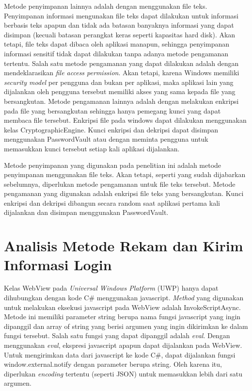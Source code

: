 Metode penyimpanan lainnya adalah dengan menggunakan file teks. Penyimpanan informasi mengunakan file teks dapat dilakukan untuk informasi berbasis teks apapun dan tidak ada batasan banyaknya informasi yang dapat disimpan (kecuali batasan perangkat keras seperti kapasitas hard disk). Akan tetapi, file teks dapat dibaca oleh aplikasi manapun, sehingga penyimpanan informasi sensitif tidak dapat dilakukan tanpa adanya metode pengamanan tertentu. Salah satu metode pengamanan yang dapat dilakukan adalah dengan mendeklarasikan \textit{file access permission}. Akan tetapi, karena Windows memiliki \textit{security model} per pengguna dan bukan per aplikasi, maka aplikasi lain yang dijalankan oleh pengguna tersebut memiliki akses yang sama kepada file yang bersangkutan. Metode pengamanan lainnya adalah dengan melakukan enkripsi pada file yang bersangkutan sehingga hanya pemegang kunci yang dapat membaca file tersebut. Enkripsi file pada windows dapat dilakukan menggunakan kelas CryptographicEngine. Kunci enkripsi dan dekripsi dapat disimpan menggunakan PasswordVault atau dengan meminta pengguna untuk memasukkan kunci tersebut setiap kali aplikasi dijalankan.

Metode penyimpanan yang digunakan pada penelitian ini adalah metode penyimpanan menggunakan file teks. Akan tetapi, seperti yang sudah dijabarkan sebelumnya, diperlukan metode pengamanan untuk file teks tersebut. Metode pengamanan yang digunakan adalah enkripsi file teks yang bersangkutan. Kunci enkripsi dan dekripsi dibangun secara random saat aplikasi pertama kali dijalankan dan disimpan menggunakan PasswordVault.



\section{Analisis Metode Rekam dan Kirim Informasi Login}
\label{sec:metode_rekam}

Kelas WebView pada \textit{Universal Windows Platform} (UWP) hanya dapat dihubungkan dengan kode C\# menggunakan javascript. \textit{Method} yang digunakan untuk melakukan eksekusi javascript pada WebView adalah InvokeScriptAsync. Metode ini memiliki parameter string berupa nama fungsi javascript yang ingin dipanggil dan array of string yang berisi argumen yang ingin dikirimkan ke dalam fungsi tersebut. Salah satu fungsi yang dapat dipanggil adalah \textit{eval}. Dengan menggunakan \textit{eval}, ekspresi javascript apapun dapat dijalankan pada WebView. Untuk mengirimkan data dari javascript ke kode C\#, dapat dijalankan fungsi window.external.notify dengan parameter berupa string. Oleh karena itu, diperlukan \textit{encoding} tertentu (seperti JSON\cite{IETF_JSON:2017}) untuk memasukkan lebih dari satu argumen.


